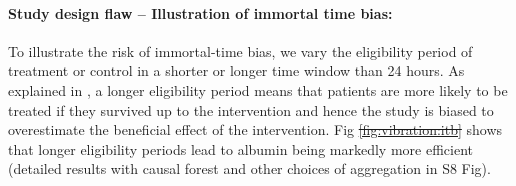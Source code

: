 \documentclass[10pt,letterpaper]{article}
\providecommand{\DIFaddtex}[1]{{\protect\color{blue}\uwave{#1}}} %
\providecommand{\DIFdeltex}[1]{{\protect\color{red}\sout{#1}}}                      %
\providecommand{\DIFaddbegin}{} %
\providecommand{\DIFaddend}{} %
\providecommand{\DIFdelbegin}{} %
\providecommand{\DIFdelend}{} %
\providecommand{\DIFadd}[1]{\texorpdfstring{\DIFaddtex{#1}}{#1}} %
\providecommand{\DIFdel}[1]{\texorpdfstring{\DIFdeltex{#1}}{}} %
\newcommand{\DIFscaledelfig}{0.5}
\newlength{\DIFdelgraphicswidth} %
\newlength{\DIFdelgraphicsheight} %
\newcommand{\DIFaddincludegraphics}[2][]{{\color{blue}\fbox{\DIFOincludegraphics[#1]{#2}}}} %
\newcommand{\DIFdelincludegraphics}[2][]{%
\sbox{\DIFdelgraphicsbox}{\DIFOincludegraphics[#1]{#2}}%
\settoboxwidth{\DIFdelgraphicswidth}{\DIFdelgraphicsbox} %
\settoboxtotalheight{\DIFdelgraphicsheight}{\DIFdelgraphicsbox} %
\scalebox{\DIFscaledelfig}{%
\parbox[b]{\DIFdelgraphicswidth}{\usebox{\DIFdelgraphicsbox}\\[-\baselineskip] \rule{\DIFdelgraphicswidth}{0em}}\llap{\resizebox{\DIFdelgraphicswidth}{\DIFdelgraphicsheight}{%
\setlength{\unitlength}{\DIFdelgraphicswidth}%
\begin{picture}(1,1)%
\thicklines\linethickness{2pt} %
{\color[rgb]{1,0,0}\put(0,0){\framebox(1,1){}}}%
{\color[rgb]{1,0,0}\put(0,0){\line( 1,1){1}}}%
{\color[rgb]{1,0,0}\put(0,1){\line(1,-1){1}}}%
\end{picture}%
}\hspace*{3pt}}} %
} %
\DeclareRobustCommand{\DIFaddbegin}{\DIFOaddbegin \let\includegraphics\DIFaddincludegraphics} %
\DeclareRobustCommand{\DIFaddend}{\DIFOaddend \let\includegraphics\DIFOincludegraphics} %
\DeclareRobustCommand{\DIFdelbegin}{\DIFOdelbegin \let\includegraphics\DIFdelincludegraphics} %
\DeclareRobustCommand{\DIFdelend}{\DIFOaddend \let\includegraphics\DIFOincludegraphics} %
\begin{document}
\paragraph{Study design flaw -- Illustration of immortal time bias:}

To illustrate the risk of immortal-time bias, we vary the eligibility period of
treatment or control in a shorter or longer time window than 24 hours. As
explained in , a longer eligibility period means that
patients are more likely to be treated if they survived up to the intervention
and hence the study is biased to overestimate the beneficial effect of the
intervention. Fig \DIFdelbegin \DIFdel{\ref{fig:vibration:itb} }\DIFdelend \DIFaddbegin \DIFadd{\ref{fig:vibration_analysis}a) }\DIFaddend shows that longer eligibility
periods lead to albumin being markedly more efficient (detailed results with causal forest and other choices of aggregation in S8 Fig).
\end{document}
